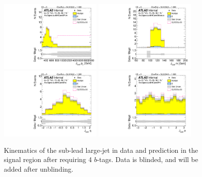 \begin{figure}[htbp!]
\begin{center}
\includegraphics[width=0.45\textwidth,angle=-90]{figures/boosted/Signal/b77_FourTag_Signal_sublHCand_Pt_m_blind.pdf}
\includegraphics[width=0.45\textwidth,angle=-90]{figures/boosted/Signal/b77_FourTag_Signal_sublHCand_Mass_s_blind.pdf}\\
\includegraphics[width=0.45\textwidth,angle=-90]{figures/boosted/Signal/b77_FourTag_Signal_sublHCand_Eta_blind.pdf}
\includegraphics[width=0.45\textwidth,angle=-90]{figures/boosted/Signal/b77_FourTag_Signal_sublHCand_Phi_blind.pdf}
  \caption{Kinematics of the sub-lead large-\R jet in data and prediction in the signal region after requiring 4 $b$-tags. Data is blinded, and will be added after unblinding.}
  \label{fig:boosted-4b-signal-blind-ak10-subl}
\end{center}
\end{figure}

